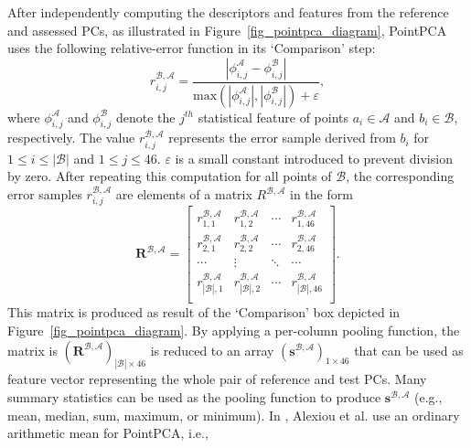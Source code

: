 \documentclass[final,3p,times,twocolumn]{elsarticle}
\begin{document}
After independently computing the descriptors and features from the reference and assessed \glspl{PC}, as illustrated in Figure~\ref{fig_pointpca_diagram}, PointPCA uses the following relative-error function in its `Comparison' step:
\begin{equation} \label{eq_comparison_funcion_pcqa}
    r_{i,j}^{\mathcal{B}, \mathcal{A}} = \frac{\left| \phi_{i,j}^{\mathcal{A}} - \phi_{i,j}^{\mathcal{B}}\right|}{\text{max}\left( \left| \phi_{i,j}^{\mathcal{A}} \right|, \left| \phi_{i,j}^{\mathcal{B}} \right| \right) + \varepsilon},
\end{equation}
where $\phi_{i,j}^{\mathcal{A}}$ and $\phi_{i,j}^{\mathcal{B}}$ denote the $j^{th}$ statistical feature of points $a_i \in \mathcal{A}$ and $b_i \in \mathcal{B}$, respectively. The value $r_{i,j}^{\mathcal{B}, \mathcal{A}}$  represents the error sample derived from $b_i$ for $1 \leq i \leq \left| \mathcal{B} \right|$ and $1 \leq j \leq 46$. $\varepsilon$ is a small constant introduced to prevent division by zero.
After repeating this computation for all points of $\mathcal{B}$, the corresponding error samples $r_{i,j}^{\mathcal{B}, \mathcal{A}}$ are elements of a matrix $R^{\mathcal{B}, \mathcal{A}}$ in the form
\begin{equation} \label{descriptor_feat}
\mathbf{R}^{\mathcal{B}, \mathcal{A}} = \begin{bmatrix}
r^{\mathcal{B}, \mathcal{A}}_{1,1} & r^{\mathcal{B}, \mathcal{A}}_{1,2} & \cdots & r^{\mathcal{B}, \mathcal{A}}_{1,46} \\
r^{\mathcal{B}, \mathcal{A}}_{2,1} & r^{\mathcal{B}, \mathcal{A}}_{2,2} & \cdots & r^{\mathcal{B}, \mathcal{A}}_{2,46} \\
\cdots & \vdots & \ddots & \cdots \\
r^{\mathcal{B}, \mathcal{A}}_{\left| \mathcal{B} \right|,1} & r^{\mathcal{B}, \mathcal{A}}_{\left| \mathcal{B} \right|,2} & \cdots & r^{\mathcal{B}, \mathcal{A}}_{\left| \mathcal{B} \right|,46} \\
\end{bmatrix}.
\end{equation}
This matrix is produced as result of the `Comparison' box depicted in Figure~\ref{fig_pointpca_diagram}. By applying a per-column pooling function, the matrix is $\left(\mathbf{R}^{\mathcal{B}, \mathcal{A}}\right)_{\left| \mathcal{B} \right|\times 46}$ is reduced to an array $\left(\mathbf{s}^{\mathcal{B}, \mathcal{A}}\right)_{1 \times 46}$ that can be used as feature vector representing the whole pair of reference and test \glspl{PC}. Many summary statistics can be used as the pooling function to produce $\mathbf{s}^{\mathcal{B}, \mathcal{A}}$ (e.g., mean, median, sum, maximum, or minimum). In \cite{alexiou2024pointpca}, Alexiou et al. use an ordinary arithmetic mean for PointPCA, i.e.,
\end{document}
